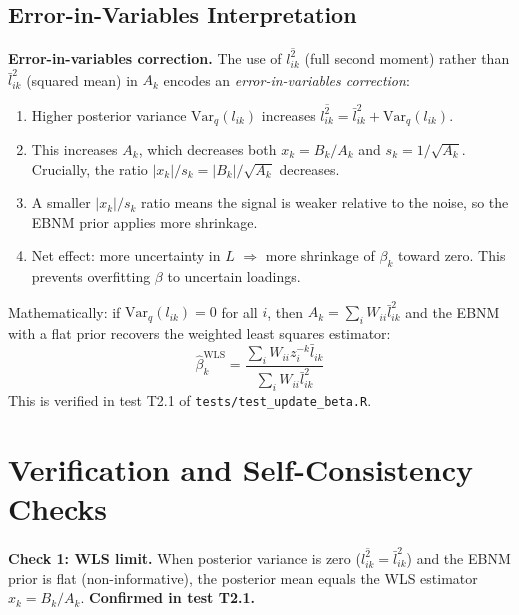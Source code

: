 \documentclass[11pt]{article}
\begin{document}
\subsection{Error-in-Variables Interpretation}

\begin{verifybox}
\textbf{Error-in-variables correction.}
The use of $\overline{l^2_{ik}}$ (full second moment) rather than
$\bar{l}_{ik}^2$ (squared mean) in $A_k$ encodes an
\emph{error-in-variables correction}:

\begin{enumerate}
  \item Higher posterior variance $\mathrm{Var}_q(l_{ik})$ increases
        $\overline{l^2_{ik}} = \bar{l}_{ik}^2 + \mathrm{Var}_q(l_{ik})$.
  \item This increases $A_k$, which decreases both $x_k = B_k/A_k$ and
        $s_k = 1/\sqrt{A_k}$.  Crucially, the ratio
        $|x_k|/s_k = |B_k|/\sqrt{A_k}$ decreases.
  \item A smaller $|x_k|/s_k$ ratio means the signal is weaker relative to
        the noise, so the EBNM prior applies more shrinkage.
  \item Net effect: more uncertainty in $L$ $\Rightarrow$ more shrinkage of
        $\beta_k$ toward zero.  This prevents overfitting $\beta$ to
        uncertain loadings.
\end{enumerate}

Mathematically: if $\mathrm{Var}_q(l_{ik}) = 0$ for all $i$, then
$A_k = \sum_i W_{ii}\bar{l}_{ik}^2$ and the EBNM with a flat prior
recovers the weighted least squares estimator:
\[
  \hat{\beta}_k^{\mathrm{WLS}} = \frac{\sum_i W_{ii} z_i^{-k} \bar{l}_{ik}}
                                       {\sum_i W_{ii} \bar{l}_{ik}^2}
\]
This is verified in test T2.1 of \texttt{tests/test\_update\_beta.R}.
\end{verifybox}

\section{Verification and Self-Consistency Checks}\label{sec:verify}

\begin{verifybox}
\textbf{Check 1: WLS limit.}
When posterior variance is zero ($\overline{l^2_{ik}} = \bar{l}_{ik}^2$)
and the EBNM prior is flat (non-informative), the posterior mean equals the
WLS estimator $x_k = B_k/A_k$.  \textbf{Confirmed in test T2.1.}
\end{verifybox}
\end{document}
